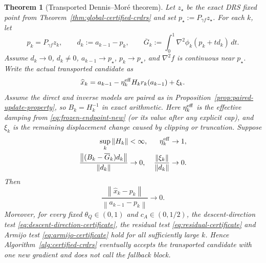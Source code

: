 \documentclass[10pt,leqno]{amsart}
\numberwithin{equation}{section}
\numberwithin{algorithm}{section}
\newtheorem{theorem}{Theorem}[section]
\theoremstyle{remark}
\newcommand{\norm}[1]{\left\lVert #1 \right\rVert}
\newcommand{\grad}{\nabla}
\begin{document}
\begin{theorem}[Transported Dennis--Mor\'e theorem]
\label{thm:transported-dm-focused}
Let $z_\star$ be the exact DRS fixed point from Theorem~\ref{thm:global-certified-crdrs} and set $p_\star:=P_{\gamma f}z_\star$.  For each $k$, let
\[
    p_k=P_{\gamma f}z_k,
    \qquad
    d_k:=a_{k-1}-p_k,
    \qquad
    \overline G_k:=\int_0^1
      \grad^2\phi_k(p_k+td_k)\,dt.
\]
Assume $d_k\to0$, $d_k\ne0$, $a_{k-1}\to p_\star$, $p_k\to p_\star$, and $\grad^2 f$ is continuous near $p_\star$.  Write the actual transported candidate as
\begin{equation}
\label{eq:actual-transported-focused}
    \widehat x_k
    =a_{k-1}-\eta_k^{\rm eff}H_k r_k(a_{k-1})+\xi_k.
\end{equation}
Assume the direct and inverse models are paired as in Proposition~\ref{prop:paired-update-property}, so $B_k=H_k^{-1}$ in exact arithmetic.  Here $\eta_k^{\rm eff}$ is the effective damping from \eqref{eq:frozen-endpoint-new} (or its value after any explicit cap), and $\xi_k$ is the remaining displacement change caused by clipping or truncation.  Suppose
\begin{align}
    \sup_k\norm{H_k}&<\infty,
    &\eta_k^{\rm eff}&\to1,
    \label{eq:dm-basic-focused}\\
    \frac{\norm{(B_k-\overline G_k)d_k}}{\norm{d_k}}&\to0,
    &
    \frac{\norm{\xi_k}}{\norm{d_k}}&\to0.
    \label{eq:dm-directional-focused}
\end{align}
Then
\begin{equation}
\label{eq:transport-superlinear-focused}
    \frac{\norm{\widehat x_k-p_k}}
         {\norm{a_{k-1}-p_k}}
    \longrightarrow0.
\end{equation}
Moreover, for every fixed $\theta_Q\in(0,1)$ and $c_A\in(0,1/2)$, the descent-direction test \eqref{eq:descent-direction-certificate}, the residual test \eqref{eq:residual-certificate} and Armijo test \eqref{eq:armijo-certificate} hold for all sufficiently large $k$.  Hence Algorithm~\ref{alg:certified-crdrs} eventually accepts the transported candidate with one new gradient and does not call the fallback block.
\end{theorem}
\end{document}
